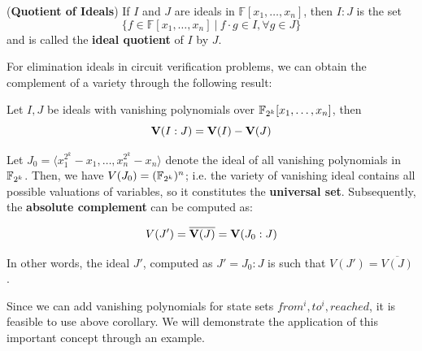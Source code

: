 \begin{definition}
({\bf Quotient of Ideals}) If $I$ and $J$ are ideals in $\mathbb
  F[x_1, \dots, x_n]$, then $I:J$ is the set
  \begin{equation}
  \{f \in \mathbb F[x_1, \dots, x_n]\ |\ f\cdot g \in I, \forall g \in J\}\nonumber
  \end{equation}
and is called the {\bf ideal quotient} of $I$ by $J$.
\end{definition}



For elimination ideals in circuit verification problems, we can obtain
the complement of a variety through the following result:

\begin{theorem}
\label{thm:quotient}
Let $I, J$ be ideals with vanishing polynomials over ${\mathbb{F}}_{2^k}[x_1,\dots,x_n]$, then 
$${\bf V}(I:J) = {\bf V}(I) - {\bf V}(J)$$
\end{theorem}


Let $J_0 = \langle x_1^{2^k} - x_1, \dots, x_n^{2^k} - x_n \rangle$
denote the ideal of all vanishing polynomials in ${\mathbb{F}}_{2^k}$. Then, we have
$V(J_0) = ({\mathbb{F}}_{2^k})^{n}$; i.e. the variety of vanishing ideal contains
all possible valuations of variables, so it constitutes the {\bf
  universal set}. Subsequently, the {\bf absolute complement} can be
computed as:

\begin{corollary}
$$V(J') = \overline{{\bf V}(J)} = {\bf V}(J_0:J)$$

\end{corollary}

In other words, the ideal $J'$, computed as $J' = J_0:J$ is such that
$V(J') =\overline{V(J)}$. 

Since we can add vanishing polynomials for state sets
$from^i, to^i, reached$, it is feasible to use above corollary. We
will demonstrate the application of this important concept through an
example. 
% 


